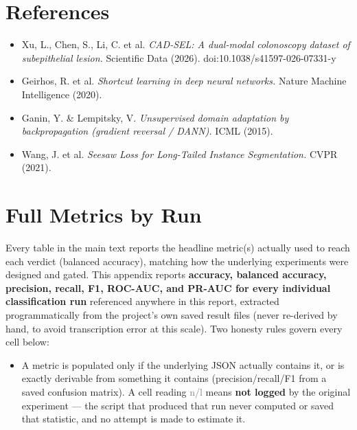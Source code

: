 \documentclass[10pt]{article}
\newcommand{\nl}{\textcolor{gray}{n/l}}
\begin{document}
\clearpage
\section*{References}

\begin{itemize}[nosep]
\item Xu, L., Chen, S., Li, C. et al. \textit{CAD-SEL: A dual-modal colonoscopy dataset of subepithelial
  lesion.} Scientific Data (2026). doi:10.1038/s41597-026-07331-y
\item Geirhos, R. et al. \textit{Shortcut learning in deep neural networks.} Nature Machine Intelligence
  (2020).
\item Ganin, Y. \& Lempitsky, V. \textit{Unsupervised domain adaptation by backpropagation (gradient
  reversal / DANN).} ICML (2015).
\item Wang, J. et al. \textit{Seesaw Loss for Long-Tailed Instance Segmentation.} CVPR (2021).
\end{itemize}

\clearpage
\appendix
\section{Full Metrics by Run}
\label{sec:appendix-metrics}

Every table in the main text reports the headline metric(s) actually used to reach each verdict (balanced
accuracy), matching how the underlying experiments were designed and gated. This appendix reports
\textbf{accuracy, balanced accuracy, precision, recall, F1, ROC-AUC, and PR-AUC for every individual
classification run} referenced anywhere in this report, extracted programmatically from the project's own
saved result files (never re-derived by hand, to avoid transcription error at this scale). Two honesty
rules govern every cell below:

\begin{itemize}[nosep]
  \item A metric is populated only if the underlying JSON actually contains it, or is exactly derivable
    from something it contains (precision/recall/F1 from a saved confusion matrix). A cell reading
    \nl{} means \textbf{not logged} by the original experiment --- the script that produced that run
    never computed or saved that statistic, and no attempt is made to estimate it.
\end{itemize}
\end{document}
